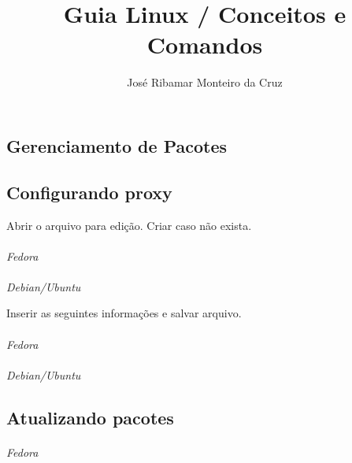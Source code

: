 \documentclass[a4paper,9pt]{extarticle}
\begin{document}
\title{Guia Linux / Conceitos e Comandos}
\author{José Ribamar Monteiro da Cruz}
\maketitle
\tableofcontents



\begin{multicols}{2}
\section{Gerenciamento de Pacotes}
\subsection{Configurando proxy}
	Abrir o arquivo para edição. Criar caso não exista.
	
	\paragraph{} \emph{Fedora}
	
	\paragraph{} \emph{Debian/Ubuntu} \newline
	
	\noindent Inserir as seguintes informações e salvar arquivo.
	
	\paragraph{} \emph{Fedora}

	\paragraph{} \emph{Debian/Ubuntu}
	
	
\subsection{Atualizando pacotes}
	
	\paragraph{} \emph{Fedora}
	

\end{multicols}
\end{document}
